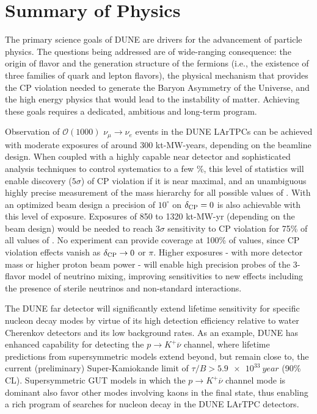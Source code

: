 
\chapter{Summary of Physics}
\label{ch:physics-summary}

The primary science goals of DUNE are drivers for the advancement of
particle physics. The questions being addressed are of wide-ranging
consequence: the origin of flavor and the generation structure of the
fermions (i.e., the existence of three families of quark and lepton
flavors), the physical mechanism that provides the CP violation needed
to generate the Baryon Asymmetry of the Universe, and the high energy
physics that would lead to the instability of matter.  Achieving these
goals requires a dedicated, ambitious and long-term program. 

Observation of $\mathcal{O}(1000)$ $\nu_\mu \rightarrow \nu_e$ events
in the DUNE LArTPCs can be achieved with moderate exposures of around
300 kt-MW-years, depending on the beamline design. When coupled with a
highly capable near detector and sophisticated analysis techniques to
control systematics to a few \%, this level of statistics will enable
discovery ($5\sigma$) of CP violation if it is near maximal, and an
unambiguous highly precise measurement of the mass hierarchy for all
possible values of \deltacp. With an optimized beam design a precision
of $10^\circ$ on $\delta_{\rm CP} = 0$ is also achievable with this
level of exposure.  Exposures of 850 to 1320 kt-MW-yr (depending on
the beam design) would be needed to reach $3\sigma$ sensitivity to CP
violation for 75\% of all values of \deltacp. No experiment can
provide coverage at 100\% of \deltacp values, since CP violation
effects vanish as $\mdeltacp\to 0$ or $\pi$. Higher exposures - with
more detector mass or higher proton beam power - will enable high
precision probes of the 3-flavor model of neutrino mixing, improving
sensitivities to new effects including the presence of sterile
neutrinos and non-standard interactions.

The DUNE far detector will significantly extend lifetime sensitivity
for specific nucleon decay modes by virtue of its high detection
efficiency relative to water Cherenkov detectors and its low
background rates.  As an example, DUNE has enhanced capability for
detecting the $p\to K^+\overline{\nu}$ channel, where lifetime
predictions from supersymmetric models extend beyond, but remain close
to, the current (preliminary) Super-Kamiokande limit of $\tau/B >
\SI{5.9e33}{year}$ (90\% CL). Supersymmetric GUT models in which
the $p\to K^+\overline{\nu}$ channel mode is dominant also favor
other modes involving kaons in the final state, thus enabling a rich 
program of searches for nucleon decay in the DUNE LArTPC detectors.

